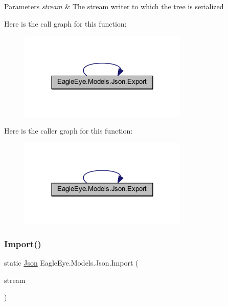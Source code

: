 \begin{DoxyParams}{Parameters}
{\em stream} & The stream writer to which the tree is serialized\\
\hline
\end{DoxyParams}
Here is the call graph for this function\+:\nopagebreak
\begin{figure}[H]
\begin{center}
\leavevmode
\includegraphics[width=228pt]{class_eagle_eye_1_1_models_1_1_json_ad911e1ca9e6ba8a8ae4c85152593c691_cgraph}
\end{center}
\end{figure}
Here is the caller graph for this function\+:\nopagebreak
\begin{figure}[H]
\begin{center}
\leavevmode
\includegraphics[width=228pt]{class_eagle_eye_1_1_models_1_1_json_ad911e1ca9e6ba8a8ae4c85152593c691_icgraph}
\end{center}
\end{figure}
\mbox{\label{class_eagle_eye_1_1_models_1_1_json_ae79a899679f529bfebb18683afd1c9d1}} 
\subsubsection{\texorpdfstring{Import()}{Import()}}
{\footnotesize\ttfamily static \mbox{\hyperlink{class_eagle_eye_1_1_models_1_1_json}{Json}} Eagle\+Eye.\+Models.\+Json.\+Import (\begin{DoxyParamCaption}\item[{Stream\+Reader}]{stream }\end{DoxyParamCaption})\hspace{0.3cm}{\ttfamily [static]}}



